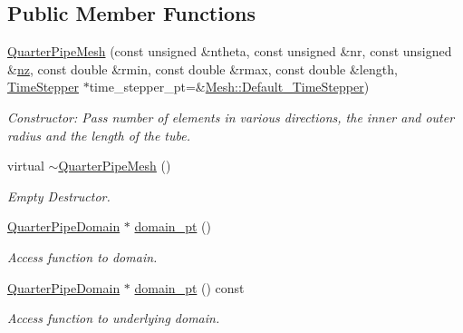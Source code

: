 \subsection*{Public Member Functions}
\begin{DoxyCompactItemize}
\item 
\hyperlink{classoomph_1_1QuarterPipeMesh_a453b84a80ccde867b8526e538135f43b}{Quarter\+Pipe\+Mesh} (const unsigned \&ntheta, const unsigned \&nr, const unsigned \&\hyperlink{classoomph_1_1SimpleCubicMesh_ad78725440e4e87598fd9339653b28e61}{nz}, const double \&rmin, const double \&rmax, const double \&length, \hyperlink{classoomph_1_1TimeStepper}{Time\+Stepper} $\ast$time\+\_\+stepper\+\_\+pt=\&\hyperlink{classoomph_1_1Mesh_a12243d0fee2b1fcee729ee5a4777ea10}{Mesh\+::\+Default\+\_\+\+Time\+Stepper})
\begin{DoxyCompactList}\small\item\em Constructor\+: Pass number of elements in various directions, the inner and outer radius and the length of the tube. \end{DoxyCompactList}\item 
virtual \hyperlink{classoomph_1_1QuarterPipeMesh_a591e2d48bd5783bb390093a18c066ffc}{$\sim$\+Quarter\+Pipe\+Mesh} ()
\begin{DoxyCompactList}\small\item\em Empty Destructor. \end{DoxyCompactList}\item 
\hyperlink{classoomph_1_1QuarterPipeDomain}{Quarter\+Pipe\+Domain} $\ast$ \hyperlink{classoomph_1_1QuarterPipeMesh_a9a1bce41d07ab1bdb8f83e77f59c4a1b}{domain\+\_\+pt} ()
\begin{DoxyCompactList}\small\item\em Access function to domain. \end{DoxyCompactList}\item 
\hyperlink{classoomph_1_1QuarterPipeDomain}{Quarter\+Pipe\+Domain} $\ast$ \hyperlink{classoomph_1_1QuarterPipeMesh_ade9c9f2cbf3c9e722a480e7a056d4c63}{domain\+\_\+pt} () const
\begin{DoxyCompactList}\small\item\em Access function to underlying domain. \end{DoxyCompactList}\end{DoxyCompactItemize}
